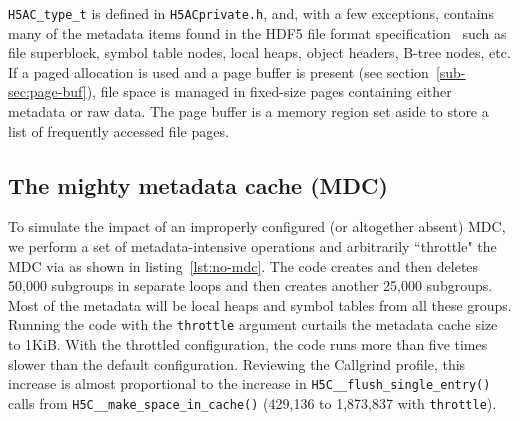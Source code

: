 \texttt{H5AC\_type\_t} is defined in \texttt{H5ACprivate.h}, and, with a few exceptions, contains many of the metadata items found in the HDF5 file format specification~\cite{ffmt} such as file superblock, symbol table nodes, local heaps, object headers, B-tree nodes, etc. If a paged allocation is used and a page buffer is present (see section~\ref{sub-sec:page-buf}), file space is managed in fixed-size pages containing either metadata or raw data. The page buffer is a memory region set aside to store a list of frequently accessed file pages.

\subsection{The mighty metadata cache (MDC)}

To simulate the impact of an improperly configured (or altogether absent) MDC, we perform a set of metadata-intensive operations and arbitrarily ``throttle" the MDC via  as shown in listing~\ref{lst:no-mdc}. The code creates and then deletes 50,000 subgroups in separate loops and then creates another 25,000 subgroups. Most of the metadata will be local heaps and symbol tables from all these groups. Running the code with the \texttt{throttle} argument curtails the metadata cache size to 1KiB. With the throttled configuration, the code runs more than five times slower than the default configuration. Reviewing the Callgrind profile, this increase is almost proportional to the increase in \texttt{H5C\_\_flush\_single\_entry()} calls from \texttt{H5C\_\_make\_space\_in\_cache()} (429,136 to 1,873,837 with \texttt{throttle}).

